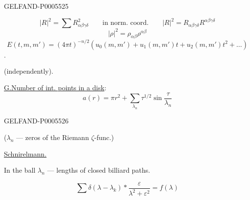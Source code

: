 \begin{GelfandAdjacentEvidence}{GELFAND-P000552}{5}

\[
|R|^2=\sum R_{\alpha\beta\gamma\delta}^2
\qquad\text{in norm. coord.}\qquad
|R|^2=R_{\alpha\beta\gamma\delta}R^{\alpha\beta\gamma\delta}
\]
\[
|\rho|^2=\rho_{\alpha\beta}\rho^{\alpha\beta}
\]
\[
E(t,m,m')=(4\pi t)^{-n/2}
\left(u_0(m,m')+u_1(m,m')t+u_2(m,m')t^2+\ldots\right)
\]
.

 (independently).

\uline{G.}\quad\uline{Number of int. points in a disk}:
\[
a(r)=\pi r^2+\sum_{\lambda_n}\tau^{1/2}\sin\frac{\tau}{\lambda_n}
\]
\end{GelfandAdjacentEvidence}
\begin{GelfandAdjacentEvidence}{GELFAND-P000552}{6}

(\(\lambda_n\) — zeros of the Riemann \(\zeta\)-func.) \quad{}

\uline{Schnirelmann.}\par
In the ball \(\lambda_n\) — lengths of closed billiard paths.
\end{GelfandAdjacentEvidence}

\[
\sum\delta(\lambda-\lambda_k)*\frac{\varepsilon}{\lambda^2+\varepsilon^2}=f(\lambda)
\]


